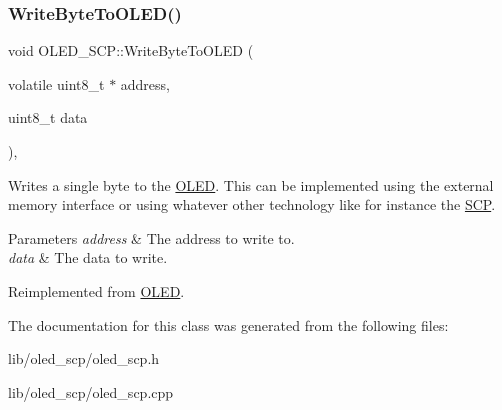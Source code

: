 \subsubsection{\texorpdfstring{Write\+Byte\+To\+O\+L\+E\+D()}{WriteByteToOLED()}}
{\footnotesize\ttfamily void O\+L\+E\+D\+\_\+\+S\+C\+P\+::\+Write\+Byte\+To\+O\+L\+ED (\begin{DoxyParamCaption}\item[{volatile uint8\+\_\+t $\ast$}]{address,  }\item[{uint8\+\_\+t}]{data }\end{DoxyParamCaption})\hspace{0.3cm}{\ttfamily [protected]}, {\ttfamily [virtual]}}

Writes a single byte to the \hyperlink{class_o_l_e_d}{O\+L\+ED}. This can be implemented using the external memory interface or using whatever other technology like for instance the \hyperlink{class_s_c_p}{S\+CP}. 
\begin{DoxyParams}{Parameters}
{\em address} & The address to write to. \\
\hline
{\em data} & The data to write. \\
\hline
\end{DoxyParams}


Reimplemented from \hyperlink{class_o_l_e_d_a044fdff65656804114d1d39d766099a2}{O\+L\+ED}.



The documentation for this class was generated from the following files\+:\begin{DoxyCompactItemize}
\item 
lib/oled\+\_\+scp/oled\+\_\+scp.\+h\item 
lib/oled\+\_\+scp/oled\+\_\+scp.\+cpp\end{DoxyCompactItemize}
